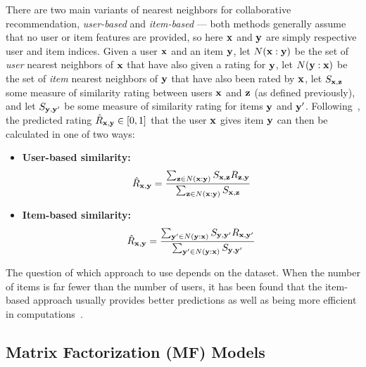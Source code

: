 There are two main variants of nearest neighbors for collaborative
recommendation, \emph{user-based} and \emph{item-based} --- both
methods generally assume that no user or item features are provided,
so here $\mathbf{x}$ and $\mathbf{y}$ are simply respective user and item indices.
Given a user $\mathbf{x}$ and an item $\mathbf{y}$, let $N(\mathbf{x}:\mathbf{y})$ be the set of
\emph{user} nearest neighbors of $\mathbf{x}$ that have also given a rating
for $\mathbf{y}$, let $N(\mathbf{y}:\mathbf{x})$ be the set of \emph{item} nearest neighbors
of $\mathbf{y}$ that have also been rated by $\mathbf{x}$, let $S_{\mathbf{x},\mathbf{z}}$ some
measure of similarity rating between users $\mathbf{x}$ and $\mathbf{z}$ (as defined
previously), and let $S_{\mathbf{y},\mathbf{y}'}$ be some measure of similarity rating for
items $\mathbf{y}$ and $\mathbf{y}'$.  Following~\cite{bellkor}, the predicted rating
$\hat{R}_{\mathbf{x},\mathbf{y}} \in [0,1]$ that the user $\mathbf{x}$ gives item $\mathbf{y}$ can
then be calculated in one of two ways:
\begin{itemize}
\item {\bf User-based similarity:}
\[
\hat{R}_{\mathbf{x},\mathbf{y}} = \frac{\sum_{\mathbf{z} \in N(\mathbf{x}:\mathbf{y})} {S_{\mathbf{x},\mathbf{z}} R_{\mathbf{z},\mathbf{y}}} } {\sum_{\mathbf{z} \in N(\mathbf{x}:\mathbf{y})}{S_{\mathbf{x},\mathbf{z}}}}
\]
\item {\bf Item-based similarity:}
\[
\hat{R}_{\mathbf{x},\mathbf{y}} = \frac{\sum_{\mathbf{y}' \in N(\mathbf{y}:\mathbf{x})} {S_{\mathbf{y},\mathbf{y}'} R_{\mathbf{x},\mathbf{y}'}} } {\sum_{\mathbf{y}' \in N(\mathbf{y}:\mathbf{x})}{S_{\mathbf{y},\mathbf{y}'}}}
\]
\end{itemize}

The question of which approach to use depends on the dataset. When the
number of items is far fewer than the number of users, it has been
found that the item-based approach usually provides better predictions
as well as being more efficient in computations~\cite{bellkor}.

\begin{comment}
This applies to the MovieLens 1 Million dataset as well. For the MovieLens 100,000 dataset, the number of items is larger than the number of users, and the user-based approach has been found to perform better.
\end{comment}

\subsection{Matrix Factorization (MF) Models}
\label{sec:mf}

